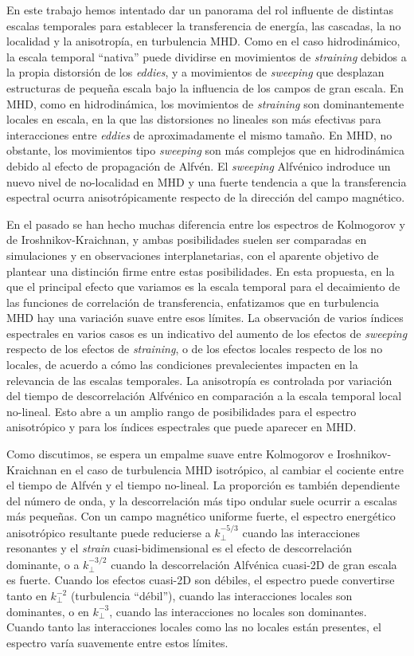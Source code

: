 En este trabajo hemos intentado dar un panorama del rol influente de
distintas escalas temporales para establecer la transferencia de
energía, las cascadas, la no localidad y la anisotropía, en
turbulencia MHD. Como en el caso hidrodinámico, la escala temporal
``nativa'' puede dividirse en movimientos de \textit{straining}
debidos a la propia distorsión de los \textit{eddies}, y a movimientos
de \textit{sweeping} que desplazan estructuras de pequeña escala bajo
la influencia de los campos de gran escala. En MHD, como en
hidrodinámica, los movimientos de \textit{straining} son
dominantemente locales en escala, en la que las distorsiones no
lineales son más efectivas para interacciones entre \textit{eddies} de
aproximadamente el mismo tamaño. En MHD, no obstante, los movimientos
tipo \textit{sweeping} son más complejos que en hidrodinámica debido
al efecto de propagación de Alfv\'en. El \textit{sweeping} Alfv\'enico
indroduce un nuevo nivel de no-localidad en MHD y una fuerte tendencia
a que la transferencia espectral ocurra anisotrópicamente respecto de
la dirección del campo magnético.

En el pasado se han hecho muchas diferencia entre los espectros de
Kolmogorov y de Iroshnikov-Kraichnan, y ambas posibilidades suelen ser
comparadas en simulaciones y en observaciones interplanetarias, con el
aparente objetivo de plantear una distinción firme entre estas
posibilidades. En esta propuesta, en la que el principal efecto que
variamos es la escala temporal para el decaimiento de las funciones de
correlación de transferencia, enfatizamos que en turbulencia MHD hay
una variación suave entre esos límites. La observación de varios
índices espectrales en varios casos es un indicativo del aumento de
los efectos de \textit{sweeping} respecto de los efectos de \textit{straining}, o de los
efectos locales respecto de los no locales, de acuerdo a cómo las
condiciones prevalecientes impacten en la relevancia de las escalas
temporales. La anisotropía es controlada por variación del tiempo de
descorrelación Alfv\'enico en comparación a la escala temporal local
no-lineal. Esto abre a un amplio rango de posibilidades para el
espectro anisotrópico y para los índices espectrales que puede
aparecer en MHD.

Como discutimos, se espera un empalme suave entre Kolmogorov e
Iroshnikov-Kraichnan en el caso de turbulencia MHD isotrópico, al
cambiar el cociente entre el tiempo de Alfv\'en y el tiempo
no-lineal. La proporción es también dependiente del número de onda, y
la descorrelación más tipo ondular suele ocurrir a escalas más
pequeñas. Con un campo magnético uniforme fuerte, el espectro
energético anisotrópico resultante puede reducierse a $k_\perp^{-5/3}$
cuando las interacciones resonantes y el \textit{strain}
cuasi-bidimensional es el efecto de descorrelación dominante, o a
$k_\perp^{-3/2}$ cuando la descorrelación Alfv\'enica cuasi-2D de gran
escala es fuerte. Cuando los efectos cuasi-2D son débiles, el espectro
puede convertirse tanto en $k_\perp^{-2}$ (turbulencia ``débil''),
cuando las interacciones locales son dominantes, o en $k_\perp^{-3}$,
cuando las interacciones no locales son dominantes. Cuando tanto las
interacciones locales como las no locales están presentes, el espectro
varía suavemente entre estos límites.

